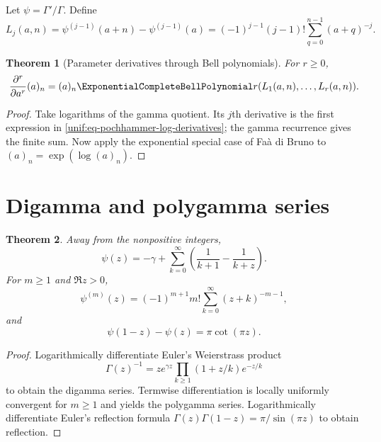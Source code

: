 \documentclass[11pt,a4paper,oneside,openany]{book}
\newtheorem{theorem}{Theorem}[chapter]
\theoremstyle{definition}
\theoremstyle{remark}
\begin{document}
Let $\psi=\Gamma'/\Gamma$. Define
\begin{equation}\label{unif:eq-pochhammer-log-derivatives}
 L_j(a,n)=\psi^{(j-1)}(a+n)-\psi^{(j-1)}(a)
 =(-1)^{j-1}(j-1)!\sum_{q=0}^{n-1}(a+q)^{-j}.
\end{equation}

\begin{theorem}[Parameter derivatives through Bell polynomials]
\label{unif:thm-pochhammer-parameter-derivatives}
For $r\ge0$,
\begin{equation}\label{unif:eq-pochhammer-bell-derivative}
 \frac{\partial^r}{\partial a^r}(a)_n
 =(a)_n\ExponentialCompleteBellPolynomial r(L_1(a,n),\ldots,L_r(a,n)).
\end{equation}
\end{theorem}
\begin{proof}
Take logarithms of the gamma quotient. Its $j$th derivative is the first
expression in \eqref{unif:eq-pochhammer-log-derivatives}; the gamma recurrence
gives the finite sum. Now apply the exponential special case of Fa\`a di
Bruno to $(a)_n=\exp(\log(a)_n)$.
\end{proof}

\section{Digamma and polygamma series}

\begin{theorem}
Away from the nonpositive integers,
\begin{equation}\label{unif:eq-digamma-series}
 \psi(z)=-\gamma+\sum_{k=0}^{\infty}
 \left(\frac1{k+1}-\frac1{k+z}\right).
\end{equation}
For $m\ge1$ and $\Re z>0$,
\begin{equation}\label{unif:eq-polygamma-series}
 \psi^{(m)}(z)=(-1)^{m+1}m!
 \sum_{k=0}^{\infty}(z+k)^{-m-1},
\end{equation}
and
\begin{equation}\label{unif:eq-digamma-reflection}
 \psi(1-z)-\psi(z)=\pi\cot(\pi z).
\end{equation}
\end{theorem}
\begin{proof}
Logarithmically differentiate Euler's Weierstrass product
\[
 \Gamma(z)^{-1}=ze^{\gamma z}
 \prod_{k\ge1}(1+z/k)e^{-z/k}
\]
to obtain the digamma series. Termwise differentiation is locally uniformly
convergent for $m\ge1$ and yields the polygamma series. Logarithmically
differentiate Euler's reflection formula
$\Gamma(z)\Gamma(1-z)=\pi/\sin(\pi z)$ to obtain reflection.
\end{proof}
\end{document}
